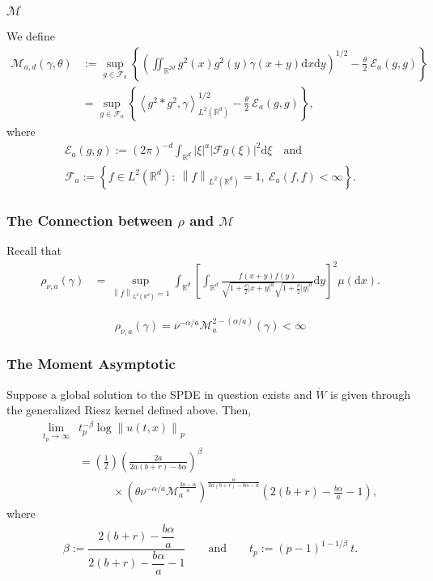 \documentclass{beamer}%
\numberwithin{equation}{section}
\newcommand{\R}{\mathbb{R}}
\newcommand{\Norm}[1]{\left\|  #1   \right\|}
\newcommand{\ud}{\ensuremath{\mathrm{d} }}
\begin{document}
	\begin{frame}[t]%
		\frametitle{$\mathcal{M}$}
		We define
		\begin{align*}
		\mathcal{M}_{a,d}(\gamma,\theta) & := \sup_{g \in \mathcal{F}_a} \left\{ \left( \iint_{\R^{2d}} g^2(x)g^2(y) \gamma(x+y)\ud x\ud y \right)^{1/2} - \frac{\theta}{2}\: \mathcal{E}_a(g,g) \right\} \\
		& = \sup_{g \in \mathcal{F}_a} \left\{ \left\langle g^2 * g^2, \gamma \right\rangle_{L^2(\R^d)}^{1/2} - \frac{\theta}{2}\: \mathcal{E}_a(g,g) \right\},
		\end{align*}
		where
		\begin{gather*}
		\mathcal{E}_a(g,g) := (2\pi)^{-d} \int_{\R^d} |\xi|^a |\mathcal{F}g(\xi)|^2 \ud \xi \quad \text{and} \\
		\mathcal{F}_a      := \left\{f\in L^2(\R^d): \: \Norm{f}_{L^2(\R^d)}=1,\: \mathcal{E}_a(f,f)<\infty \right\}.
		\end{gather*}
	\end{frame}%
	
	\begin{frame}%
		\frametitle{The Connection between $\rho$ and $\mathcal{M}$}
		Recall that
		\begin{align*}
		\rho_{\nu,a}(\gamma) &= \sup_{\Norm{f}_{L^2(\R^d)} =1} \int_{\R^d} \left[ \int_{\R^d} \frac{f(x+y)f(y)}{\sqrt{1+\frac{\nu}{2}|x+y|^a } \sqrt{1+\frac{\nu}{2}|y|^a} } \ud y \right]^2 \mu(\ud x).
		\end{align*}
		
		\begin{theorem}
			\[
			\rho_{\nu,a}(\gamma) = \nu^{-\alpha/a} \mathcal{M}_a^{2-(\alpha / a)}(\gamma)<\infty
			\]
		\end{theorem}
	\end{frame}%
	
	\begin{frame}[t]%
		\frametitle{The Moment Asymptotic}
		\begin{theorem}
			Suppose a global solution to the SPDE in question exists and $\dot{W}$ is given through the generalized Riesz kernel defined above. Then,
			\begin{align*}
			\lim_{t_p \to \infty} & t_p^{-\beta} \log \Norm{u(t,x)}_p                                          \\
			& =  \left(\frac{1}{2}\right)\left(\frac{2a}{2a(b+r)- b\alpha} \right)^\beta \\
			& \quad \quad \quad  \times \left(\theta\nu^{-\alpha/a} \mathcal{M}_a^{\frac{2a-\alpha}{a}}\right)^{\frac{a}{2a(b+r)-b\alpha-a}}\left(2(b+r)-\frac{b\alpha}{a}-1\right),
			\end{align*}
			where
			\begin{align*}
			\beta := \dfrac{2(b+r)-\dfrac{b\alpha}{a}}{ 2(b+r)-\dfrac{b\alpha}{a} -1 } \qquad \text{and} \qquad
			t_p   := (p-1)^{1-1/\beta} \: t.
			\end{align*}
		\end{theorem}
	\end{frame}%
	
\end{document}
